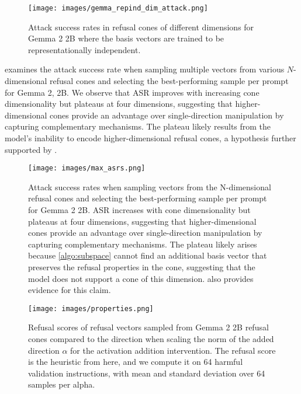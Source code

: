 \begin{figure}
    \centering
    \hspace*{5em} 
    \texttt{[image: images/gemma\_repind\_dim\_attack.png]}
    \caption{Attack success rates in refusal cones of different dimensions for Gemma 2 2B where the basis vectors are trained to be representationally independent.}
    \label{fig:cone-repind}
\end{figure}

 examines the attack success rate when sampling multiple vectors from various $N$-dimensional refusal cones and selecting the best-performing sample per prompt for Gemma 2, 2B. We observe that ASR improves with increasing cone dimensionality but plateaus at four dimensions, suggesting that higher-dimensional cones provide an advantage over single-direction manipulation by capturing complementary mechanisms. The plateau likely results from the model’s inability to encode higher-dimensional refusal cones, a hypothesis further supported by .
\begin{figure}
    \centering
    \texttt{[image: images/max\_asrs.png]}
    \caption{Attack success rates when sampling vectors from the N-dimensional refusal cones and selecting the best-performing sample per prompt for Gemma 2 2B. ASR increases with cone dimensionality but plateaus at four dimensions, suggesting that higher-dimensional cones provide an advantage over single-direction manipulation by capturing complementary mechanisms. The plateau likely arises because \cref{algo:subspace} cannot find an additional basis vector that preserves the refusal properties in the cone, suggesting that the model does not support a cone of this dimension.  also provides evidence for this claim.}
    \label{fig:asr_given_conedim}
\end{figure}

\begin{figure}
    \centering
    \texttt{[image: images/properties.png]}
    \caption{Refusal scores of refusal vectors sampled from Gemma 2 2B refusal cones compared to the \dimacro direction when scaling the norm of the added direction $\alpha$ for the activation addition intervention. The refusal score is the heuristic from \citet{arditi2024refusallanguagemodelsmediated} here, and we compute it on 64 harmful validation instructions, with mean and standard deviation over 64 samples per alpha.}
    \label{fig:refusal_properties}
\end{figure}



